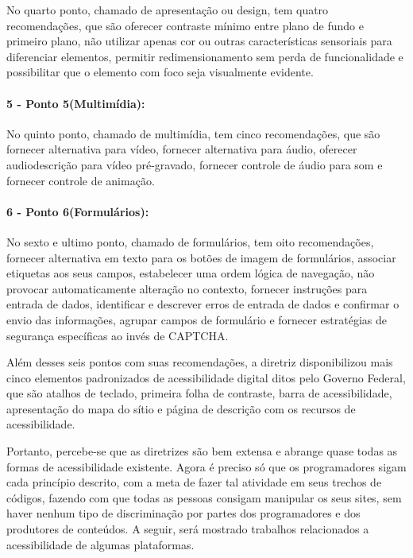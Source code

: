 \documentclass[a4paper]{article}
\begin{document}
\begin{titlepage}
No quarto ponto, chamado de apresentação ou design, tem quatro recomendações, que são oferecer contraste mínimo entre plano de fundo e primeiro plano, não utilizar apenas cor ou outras características sensoriais para diferenciar elementos, permitir redimensionamento sem perda de funcionalidade e possibilitar que o elemento com foco seja visualmente evidente.

\paragraph{5 - Ponto 5(Multimídia): }

No quinto ponto, chamado de multimídia, tem cinco recomendações, que são fornecer alternativa para vídeo, fornecer alternativa para áudio, oferecer audiodescrição para vídeo pré-gravado, fornecer controle de áudio para som e fornecer controle de animação.

\paragraph{6 - Ponto 6(Formulários): }

No sexto e ultimo ponto, chamado de formulários, tem oito recomendações, fornecer alternativa em texto para os botões de imagem de formulários, associar etiquetas aos seus campos, estabelecer uma ordem lógica de navegação, não provocar automaticamente alteração no contexto, fornecer instruções para entrada de dados, identificar e descrever erros de entrada de dados e confirmar o envio das informações, agrupar campos de formulário e fornecer estratégias de segurança específicas ao invés de CAPTCHA.

Além desses seis pontos com suas recomendações, a diretriz disponibilizou mais cinco elementos padronizados de acessibilidade digital ditos pelo Governo Federal, que são atalhos de teclado, primeira folha de contraste, barra de acessibilidade, apresentação do mapa do sítio e página de descrição com os recursos de acessibilidade.

Portanto, percebe-se que as diretrizes são bem extensa e abrange quase todas as formas de acessibilidade existente. Agora é preciso só que os programadores sigam cada princípio descrito, com a meta de fazer tal atividade em seus trechos de códigos, fazendo com que todas as pessoas consigam manipular os seus sites, sem haver nenhum tipo de discriminação por partes dos programadores e dos produtores de conteúdos. A seguir, será mostrado trabalhos relacionados a acessibilidade de algumas plataformas.


\end{titlepage}
\end{document}
